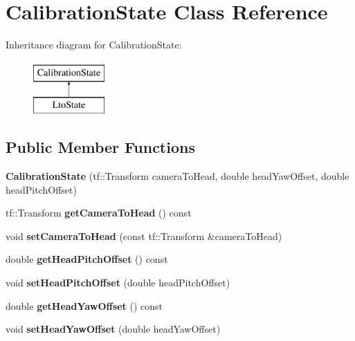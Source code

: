 \hypertarget{classCalibrationState}{\section{\-Calibration\-State \-Class \-Reference}
\label{classCalibrationState}
}
\-Inheritance diagram for \-Calibration\-State\-:\begin{figure}[H]
\begin{center}
\leavevmode
\includegraphics[height=2.000000cm]{classCalibrationState}
\end{center}
\end{figure}
\subsection*{\-Public \-Member \-Functions}
\begin{DoxyCompactItemize}
\item 
\hypertarget{classCalibrationState_a7002f5f76f264c02f739f0ace6111b42}{{\bfseries \-Calibration\-State} (tf\-::\-Transform camera\-To\-Head, double head\-Yaw\-Offset, double head\-Pitch\-Offset)}\label{classCalibrationState_a7002f5f76f264c02f739f0ace6111b42}

\item 
\hypertarget{classCalibrationState_a099c6593f5ec4addd6f20e493abcbad8}{tf\-::\-Transform {\bfseries get\-Camera\-To\-Head} () const }\label{classCalibrationState_a099c6593f5ec4addd6f20e493abcbad8}

\item 
\hypertarget{classCalibrationState_aa2872b95786b896a3bd3bdaf6835cbde}{void {\bfseries set\-Camera\-To\-Head} (const tf\-::\-Transform \&camera\-To\-Head)}\label{classCalibrationState_aa2872b95786b896a3bd3bdaf6835cbde}

\item 
\hypertarget{classCalibrationState_a15355c0a9e96021d0910b6f05c5ed182}{double {\bfseries get\-Head\-Pitch\-Offset} () const }\label{classCalibrationState_a15355c0a9e96021d0910b6f05c5ed182}

\item 
\hypertarget{classCalibrationState_a0575b632bdf3e6491867aeba5656f42f}{void {\bfseries set\-Head\-Pitch\-Offset} (double head\-Pitch\-Offset)}\label{classCalibrationState_a0575b632bdf3e6491867aeba5656f42f}

\item 
\hypertarget{classCalibrationState_ad44ffdadc1c02f4a7bb25ae80acfb974}{double {\bfseries get\-Head\-Yaw\-Offset} () const }\label{classCalibrationState_ad44ffdadc1c02f4a7bb25ae80acfb974}

\item 
\hypertarget{classCalibrationState_a379d025cd3dff837a89620137dda3919}{void {\bfseries set\-Head\-Yaw\-Offset} (double head\-Yaw\-Offset)}\label{classCalibrationState_a379d025cd3dff837a89620137dda3919}

\end{DoxyCompactItemize}
